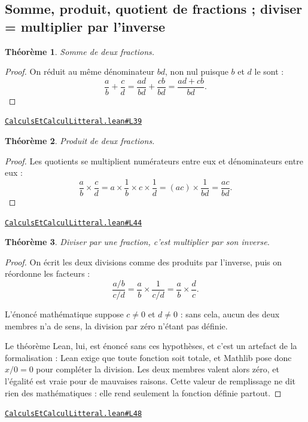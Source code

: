 \documentclass[11pt,a4paper]{article}
\theoremstyle{definition}
\theoremstyle{plain}
\newtheorem{theoreme}{Théorème}
\newcommand{\source}[2]{\par\smallskip\noindent\hfill{\footnotesize\href{#1}{\texttt{#2}}}\par\smallskip}
\begin{document}
\subsection{Somme, produit, quotient de fractions ; diviser = multiplier par l'inverse}

\begin{theoreme}
Somme de deux fractions.
\end{theoreme}

\begin{proof}
On réduit au même dénominateur $bd$, non nul puisque $b$ et $d$ le sont :
\[
\frac{a}{b} + \frac{c}{d} = \frac{ad}{bd} + \frac{cb}{bd} = \frac{ad + cb}{bd} .
\]
\end{proof}
\source{https://github.com/Commutator-IO/learn-lean/blob/main/cours/01-college/01-nombres-et-calculs/CalculsEtCalculLitteral.lean\#L39}{CalculsEtCalculLitteral.lean\#L39}

\begin{theoreme}
Produit de deux fractions.
\end{theoreme}

\begin{proof}
Les quotients se multiplient numérateurs entre eux et dénominateurs entre eux :
\[
\frac{a}{b} \times \frac{c}{d}
  = a \times \frac1b \times c \times \frac1d
  = (ac) \times \frac{1}{bd}
  = \frac{ac}{bd} .
\]
\end{proof}
\source{https://github.com/Commutator-IO/learn-lean/blob/main/cours/01-college/01-nombres-et-calculs/CalculsEtCalculLitteral.lean\#L44}{CalculsEtCalculLitteral.lean\#L44}

\begin{theoreme}
Diviser par une fraction, c'est multiplier par son inverse.
\end{theoreme}

\begin{proof}
On écrit les deux divisions comme des produits par l'inverse, puis on réordonne les
facteurs :
\[
\frac{a/b}{c/d} = \frac{a}{b} \times \frac{1}{c/d}
                = \frac{a}{b} \times \frac{d}{c} .
\]

L'énoncé mathématique suppose $c \ne 0$ et $d \ne 0$ : sans cela, aucun des deux membres
n'a de sens, la division par zéro n'étant pas définie.

Le théorème Lean, lui, est énoncé sans ces hypothèses, et c'est un artefact de la
formalisation : Lean exige que toute fonction soit totale, et Mathlib pose donc
$x/0 = 0$ pour compléter la division. Les deux membres valent alors zéro, et l'égalité
est vraie pour de mauvaises raisons. Cette valeur de remplissage ne dit rien des
mathématiques : elle rend seulement la fonction définie partout.
\end{proof}
\source{https://github.com/Commutator-IO/learn-lean/blob/main/cours/01-college/01-nombres-et-calculs/CalculsEtCalculLitteral.lean\#L48}{CalculsEtCalculLitteral.lean\#L48}
\end{document}
